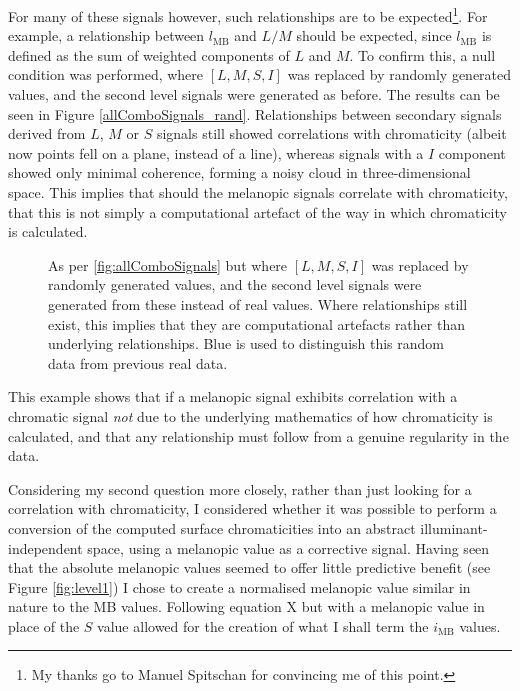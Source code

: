 For many of these signals however, such relationships are to be expected\footnote{My thanks go to Manuel Spitschan for convincing me of this point.}. For example, a relationship between $l_{\text{MB}}$ and $L/M$ should be expected, since $l_{\text{MB}}$ is defined as the sum of weighted components of $L$ and $M$. To confirm this, a null condition was performed, where $[L,M,S,I]$ was replaced by randomly generated values, and the second level signals were generated as before. The results can be seen in Figure \ref{allComboSignals_rand}. Relationships between secondary signals derived from $L$, $M$ or $S$ signals still showed correlations with chromaticity (albeit now points fell on a plane, instead of a line), whereas signals with a $I$ component showed only minimal coherence, forming a noisy cloud in three-dimensional space. This implies that should the melanopic signals correlate with chromaticity, that this is not simply a computational artefact of the way in which chromaticity is calculated.

\clearpage

\begin{figure}[p]
    \caption{As per \ref{fig:allComboSignals} but where $[L,M,S,I]$ was replaced by randomly generated values, and the second level signals were generated from these instead of real values. Where relationships still exist, this implies that they are computational artefacts rather than underlying relationships. Blue is used to distinguish this random data from previous real data.}
    \label{fig:allComboSignals_rand}
\end{figure} 
\clearpage

This example shows that if a melanopic signal exhibits correlation with a chromatic signal \emph{not} due to the underlying mathematics of how chromaticity is calculated, and that any relationship must follow from a genuine regularity in the data.

Considering my second question more closely, rather than just looking for a correlation with chromaticity, I considered whether it was possible to perform a conversion of the computed surface chromaticities into an abstract illuminant-independent space, using a melanopic value as a corrective signal. Having seen that the absolute melanopic values seemed to offer little predictive benefit (see Figure \ref{fig:level1}) I chose to create a normalised melanopic value similar in nature to the MB values. Following equation X %
but with a melanopic value in place of the $S$ value allowed for the creation of what I shall term the $i_{\text{MB}}$ values.

